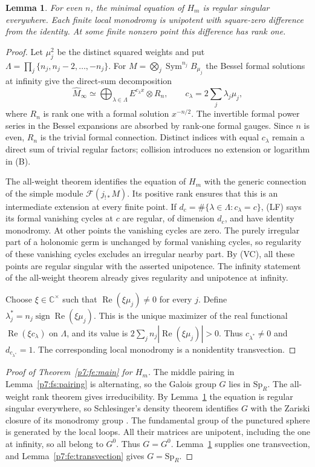 \documentclass[11pt,a4paper]{article}
\newtheorem{lemma}[theorem]{Lemma}
\theoremstyle{definition}
\theoremstyle{remark}
\numberwithin{equation}{section}
\begin{document}
\begin{lemma}\label{p7:fe:local}
For even $n$, the minimal equation of $H_m$ is regular singular
everywhere. Each finite local monodromy is unipotent with square-zero
difference from the identity. At some finite nonzero point this
difference has rank one.
\end{lemma}
\begin{proof}
Let $\mu_j^2$ be the distinct squared weights and put
$\Lambda=\prod_j\{n_j,n_j-2,\ldots,-n_j\}$.
For $M=\bigotimes_j\operatorname{Sym}^{n_j}B_{\mu_j}$ the Bessel
formal solutions at infinity give the direct-sum decomposition
\[
 \widehat M_\infty\simeq
 \bigoplus_{\lambda\in\Lambda}
    E^{c_\lambda x}\otimes R_n,
 \qquad c_\lambda=2\sum_j\lambda_j\mu_j,
 \tag{B}
\]
where $R_n$ is rank one with a formal solution $x^{-n/2}$.
The invertible formal power series in the Bessel expansions are
absorbed by rank-one formal gauges. Since $n$ is even, $R_n$ is
the trivial formal connection. Distinct indices with equal
$c_\lambda$ remain a direct sum of trivial regular factors;
collision introduces no extension or logarithm in (B).

The all-weight theorem identifies the equation of $H_m$ with the
generic connection of the simple module
$\mathcal F(j_{!*}M)$. Its positive rank ensures that this is an
intermediate extension at every finite point. If
$d_c=\#\{\lambda\in\Lambda:c_\lambda=c\}$, (LF) says its formal
vanishing cycles at $c$ are regular, of dimension $d_c$, and have
identity monodromy. At other points the vanishing cycles are zero.
The purely irregular part of a holonomic germ is unchanged by
formal vanishing cycles, so regularity of these vanishing cycles
excludes an irregular nearby part. By (VC), all these points are
regular singular with the asserted unipotence. The infinity statement of the all-weight theorem
already gives regularity and unipotence at infinity.

Choose $\xi\in\mathbb C^\times$ such that
$\operatorname{Re}(\xi\mu_j)\ne0$ for every $j$. Define
$\lambda_j^*=n_j\operatorname{sign}\operatorname{Re}(\xi\mu_j)$.
This is the unique maximizer of the real functional
$\operatorname{Re}(\xi c_\lambda)$ on $\Lambda$, and its value is
$2\sum_jn_j|\operatorname{Re}(\xi\mu_j)|>0$.
Thus $c_{\lambda^*}\ne0$ and $d_{c_{\lambda^*}}=1$.
The corresponding local monodromy is a nonidentity transvection.
\end{proof}

\begin{proof}[Proof of Theorem~\ref{p7:fe:main} for $H_m$]
The middle pairing in Lemma~\ref{p7:fs:pairing} is alternating, so the
Galois group $G$ lies in $\mathrm{Sp}_R$. The all-weight rank theorem
gives irreducibility. By Lemma~\ref{p7:fe:local} the equation is
regular singular everywhere, so Schlesinger's density theorem
identifies $G$ with the Zariski closure of its monodromy group
\cite{p5:BG_vdPS2003}. The fundamental group of the punctured sphere
is generated by the local loops. All their matrices are unipotent,
including the one at infinity, so all belong to $G^0$. Thus $G=G^0$.
Lemma~\ref{p7:fe:local} supplies one transvection, and
Lemma~\ref{p7:fe:transvection} gives $G=\mathrm{Sp}_R$.
\end{proof}
\end{document}
